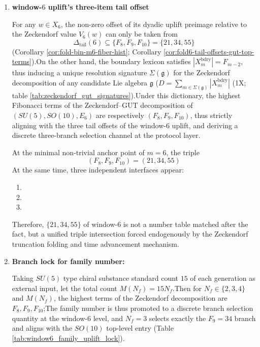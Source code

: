 \begin{enumerate}
\item \textbf{window-\(6\) uplift's three-item tail offset }
\begin{theorem}  \label{thm:terminal-window6-tail-three-branch}
For any \(w\in X_6\), the non-zero offset of its dyadic uplift preimage relative to the Zeckendorf value \(V_6(w)\) can only be taken from  \[
  \Delta_{\mathrm{tail}}(6)\subseteq\{F_8,F_9,F_{10}\}=\{21,34,55\}
  \]
(Corollary \ref{cor:fold-bin-m6-fiber-hist}; Corollary \ref{cor:fold6-tail-offsets-gut-top-terms}).On the other hand, the boundary lexicon satisfies \(|X_m^{\mathrm{bdry}}|=F_{m-2}\), thus inducing a unique resolution signature \(\Sigma(\mathfrak g)\) for the Zeckendorf decomposition of any candidate Lie algebra \(\mathfrak g\) (\(D=\sum_{m\in\Sigma(\mathfrak g)}|X_m^{\mathrm{bdry}}|\) (\SXPH1X; table \ref{tab:zeckendorf_gut_signatures}).Under this dictionary, the highest Fibonacci terms of the Zeckendorf--GUT decomposition of \((SU(5),SO(10),E_6)\) are respectively \((F_8,F_9,F_{10})\), thus strictly aligning with the three tail offsets of the window-\(6\) uplift, and deriving a discrete three-branch selection channel at the protocol layer.  \end{theorem}

\begin{theorem}\label{thm:terminal-window6-unification-triple-dynamic}At the minimal non-trivial anchor point of \(m=6\), the triple  \[
  (F_8,F_9,F_{10})=(21,34,55)
  \]
At the same time, three independent interfaces appear:  \begin{enumerate}
\item\item\item  \end{enumerate}
Therefore, \(\{21,34,55\}\) of window-\(6\) is not a number table matched after the fact, but a unified triple intersection forced endogenously by the Zeckendorf truncation folding and time advancement mechanism.  \end{theorem}

\item \textbf{Branch lock for family number: }
\begin{theorem}  \label{thm:terminal-family-uplift-lock}
Taking \(SU(5)\) type chiral substance standard count \(15\) of each generation as external input, let the total count \(M(N_f)=15N_f\).Then for \(N_f\in\{2,3,4\}\) and \(M(N_f)\), the highest terms of the Zeckendorf decomposition are \(F_8,F_9,F_{10}\);The family number is thus promoted to a discrete branch selection quantity at the window-\(6\) level, and \(N_f=3\) selects exactly the \(F_9=34\) branch and aligns with the \(SO(10)\) top-level entry (Table \ref{tab:window6_family_uplift_lock}).  \end{theorem}


\end{enumerate}
